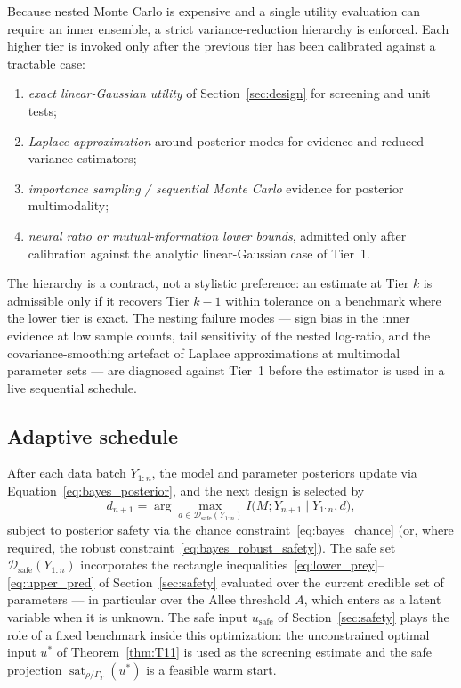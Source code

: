 Because nested Monte Carlo is expensive and a single utility evaluation can require an inner ensemble, a strict variance-reduction hierarchy is enforced. Each higher tier is invoked only after the previous tier has been calibrated against a tractable case:
\begin{enumerate}
\item \emph{exact linear-Gaussian utility} of Section~\ref{sec:design} for screening and unit tests;
\item \emph{Laplace approximation} around posterior modes for evidence and reduced-variance estimators;
\item \emph{importance sampling / sequential Monte Carlo} evidence for posterior multimodality;
\item \emph{neural ratio or mutual-information lower bounds}, admitted only after calibration against the analytic linear-Gaussian case of Tier~1.
\end{enumerate}
The hierarchy is a contract, not a stylistic preference: an estimate at Tier $k$ is admissible only if it recovers Tier $k-1$ within tolerance on a benchmark where the lower tier is exact. The nesting failure modes --- sign bias in the inner evidence at low sample counts, tail sensitivity of the nested log-ratio, and the covariance-smoothing artefact of Laplace approximations at multimodal parameter sets --- are diagnosed against Tier~1 before the estimator is used in a live sequential schedule.

\subsection{Adaptive schedule}
\label{subsec:bayes:adaptive}

After each data batch $Y_{1:n}$, the model and parameter posteriors update via Equation~\eqref{eq:bayes_posterior}, and the next design is selected by
\begin{equation}
d_{n+1}
= \arg\max_{d \in \mathcal{D}_{\mathrm{safe}}(Y_{1:n})}
I\bigl(M; Y_{n+1} \mid Y_{1:n}, d\bigr),
\label{eq:bayes_adaptive}
\end{equation}
subject to posterior safety via the chance constraint~\eqref{eq:bayes_chance} (or, where required, the robust constraint~\eqref{eq:bayes_robust_safety}). The safe set $\mathcal{D}_{\mathrm{safe}}(Y_{1:n})$ incorporates the rectangle inequalities~\eqref{eq:lower_prey}--\eqref{eq:upper_pred} of Section~\ref{sec:safety} evaluated over the current credible set of parameters --- in particular over the Allee threshold $A$, which enters as a latent variable when it is unknown. The safe input $u_{\mathrm{safe}}$ of Section~\ref{sec:safety} plays the role of a fixed benchmark inside this optimization: the unconstrained optimal input $u^{*}$ of Theorem~\ref{thm:T11} is used as the screening estimate and the safe projection $\operatorname{sat}_{\rho/\Gamma_T}(u^{*})$ is a feasible warm start.

